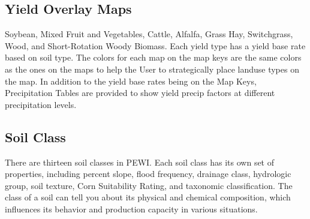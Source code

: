 \documentclass[11pt]{article}
\begin{document}
\subsection{Yield Overlay Maps}
Soybean, Mixed Fruit and Vegetables, Cattle, Alfalfa, Grass Hay, Switchgrass, Wood, and Short-Rotation Woody Biomass. Each yield type has a yield base rate based on soil type. The colors for each map on the map keys are the same colors as the ones on the maps to help the User to strategically place landuse types on the map. In addition to the yield base rates being on the Map Keys, Precipitation Tables are provided to show yield precip factors at different precipitation levels. 

\subsection{Soil Class}
There are thirteen soil classes in PEWI. Each soil class has its own set of properties, including percent slope, flood frequency, drainage class, hydrologic group, soil texture, Corn Suitability Rating, and taxonomic classification. The class of a soil can tell you about its physical and chemical composition, which influences its behavior and production capacity in various situations. 
\end{document}
